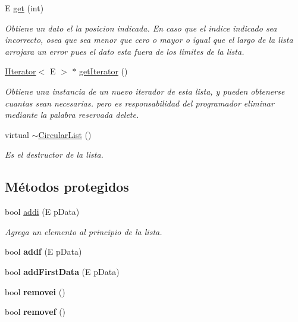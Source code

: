 \begin{DoxyCompactItemize}
E \hyperlink{classCircularList_ad6783339c7ff05841fc62f74f809644d}{get} (int)
\begin{DoxyCompactList}\small\item\em Obtiene un dato el la posicion indicada. En caso que el indice indicado sea incorrecto, osea que sea menor que cero o mayor o igual que el largo de la lista arrojara un error pues el dato esta fuera de los limites de la lista. \end{DoxyCompactList}\item 
\hyperlink{classIIterator}{I\-Iterator}$<$ E $>$ $\ast$ \hyperlink{classCircularList_a43e6cf1632001b3f409c6ce531529c6e}{get\-Iterator} ()
\begin{DoxyCompactList}\small\item\em Obtiene una instancia de un nuevo iterador de esta lista, y pueden obtenerse cuantas sean necesarias. pero es responsabilidad del programador eliminar mediante la palabra reservada delete. \end{DoxyCompactList}\item 
\hypertarget{classCircularList_aa65c9665b7d36a5e609752cad0a35dbb}{virtual \hyperlink{classCircularList_aa65c9665b7d36a5e609752cad0a35dbb}{$\sim$\-Circular\-List} ()}\label{classCircularList_aa65c9665b7d36a5e609752cad0a35dbb}

\begin{DoxyCompactList}\small\item\em Es el destructor de la lista. \end{DoxyCompactList}\end{DoxyCompactItemize}
\subsection*{Métodos protegidos}
\begin{DoxyCompactItemize}
\item 
bool \hyperlink{classCircularList_a6f405f4be7946286a958e0b83937b3e2}{addi} (E p\-Data)
\begin{DoxyCompactList}\small\item\em Agrega un elemento al principio de la lista. \end{DoxyCompactList}\item 
\hypertarget{classCircularList_ad2832eb48d7d69fa5d759c0c16c4bc5e}{bool {\bfseries addf} (E p\-Data)}\label{classCircularList_ad2832eb48d7d69fa5d759c0c16c4bc5e}

\item 
\hypertarget{classCircularList_a0a3f318454d748eff1e3b8729aea94bd}{bool {\bfseries add\-First\-Data} (E p\-Data)}\label{classCircularList_a0a3f318454d748eff1e3b8729aea94bd}

\item 
\hypertarget{classCircularList_a706dd0ab6fb475bec90d9c40cefa92b1}{bool {\bfseries removei} ()}\label{classCircularList_a706dd0ab6fb475bec90d9c40cefa92b1}

\item 
\hypertarget{classCircularList_a1dde06b77306b31eb38fa4b43b6009ab}{bool {\bfseries removef} ()}\label{classCircularList_a1dde06b77306b31eb38fa4b43b6009ab}

\end{DoxyCompactItemize}

